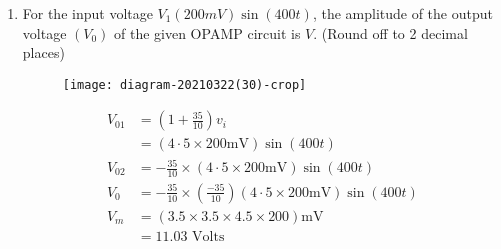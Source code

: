 \begin{enumerate}
\begin{answer}
\end{answer}
	\item For the input voltage $V_{1}(200 m V) \sin (400 t)$, the amplitude of the output voltage $\left(V_{0}\right)$ of the given OPAMP circuit is $V$. (Round off to 2 decimal places)
\begin{figure}[H]
	\centering
	\texttt{[image: diagram-20210322(30)-crop]}
\end{figure}
\begin{answer}
\begin{align*}
V_{01}&=\left(1+\frac{35}{10}\right) v_{i}\\&=(4 \cdot 5 \times 200 \mathrm{mV}) \sin (400 t) \\
V_{02}&=-\frac{35}{10} \times(4 \cdot 5 \times 200 \mathrm{mV}) \sin (400 t) \\
V_{0}&=-\frac{35}{10} \times\left(\frac{-35}{10}\right)(4 \cdot 5 \times 200 \mathrm{mV}) \sin (400 t) \\
V_{m}&=(3.5 \times 3.5 \times 4.5 \times 200) \mathrm{mV}\\&=11.03 \text { Volts }
\end{align*}

\end{answer}
\end{enumerate}